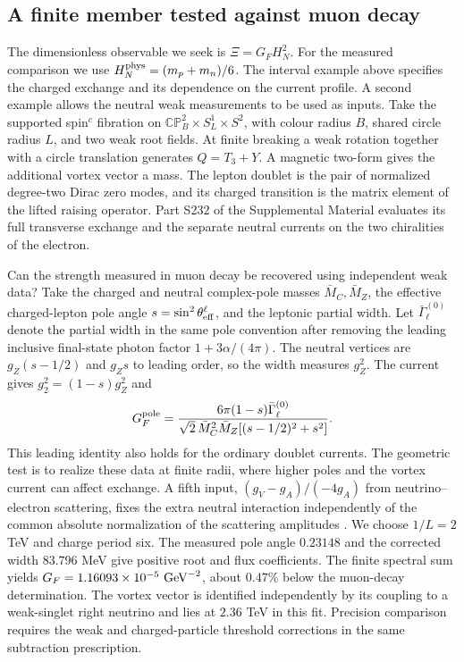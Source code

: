 \documentclass[aps,prd,reprint,onecolumn,nofootinbib,amsmath,amssymb]{revtex4-2}
\begin{document}
\subsection{A finite member tested against muon decay}
The dimensionless observable we seek is $\Xi=G_FH_N^2$. For the measured comparison we use $H_N^{\rm phys}=(m_p+m_n)/6$. The interval example above specifies the charged exchange and its dependence on the current profile. A second example allows the neutral weak measurements to be used as inputs. Take the supported spin$^c$ fibration on $\mathbb{CP}^2_B\times S^1_L\times S^2$, with colour radius $B$, shared circle radius $L$, and two weak root fields. At finite breaking a weak rotation together with a circle translation generates $Q=T_3+Y$. A magnetic two-form gives the additional vortex vector a mass. The lepton doublet is the pair of normalized degree-two Dirac zero modes, and its charged transition is the matrix element of the lifted raising operator. Part S232 of the Supplemental Material evaluates its full transverse exchange and the separate neutral currents on the two chiralities of the electron.

Can the strength measured in muon decay be recovered using independent weak data? Take the charged and neutral complex-pole masses $\bar M_C,\bar M_Z$, the effective charged-lepton pole angle $s=\sin^2\theta_{\rm eff}^{\ell}$, and the leptonic partial width. Let $\bar\Gamma_\ell^{(0)}$ denote the partial width in the same pole convention after removing the leading inclusive final-state photon factor $1+3\alpha/(4\pi)$. The neutral vertices are $g_Z(s-1/2)$ and $g_Zs$ to leading order, so the width measures $g_Z^2$. The current gives $g_2^2=(1-s)g_Z^2$ and
\begin{equation}
 G_F^{\rm pole}=
 \frac{6\pi(1-s)\bar\Gamma_\ell^{(0)}}
 {\sqrt2\,\bar M_C^2\bar M_Z[(s-1/2)^2+s^2]} .
 \label{eq:fermiwidth}
\end{equation}
This leading identity also holds for the ordinary doublet currents. The geometric test is to realize these data at finite radii, where higher poles and the vortex current can affect exchange. A fifth input, $(g_V-g_A)/(-4g_A)$ from neutrino--electron scattering, fixes the extra neutral interaction independently of the common absolute normalization of the scattering amplitudes \cite{PDG2026Gauge,CHARMII1994}. We choose $1/L=2$ TeV and charge period six. The measured pole angle $0.23148$ and the corrected width $83.796$ MeV give positive root and flux coefficients. The finite spectral sum yields $G_F=1.16093\times10^{-5}\ {\rm GeV}^{-2}$, about $0.47\%$ below the muon-decay determination. The vortex vector is identified independently by its coupling to a weak-singlet right neutrino and lies at $2.36$ TeV in this fit. Precision comparison requires the weak and charged-particle threshold corrections in the same subtraction prescription.
\end{document}
